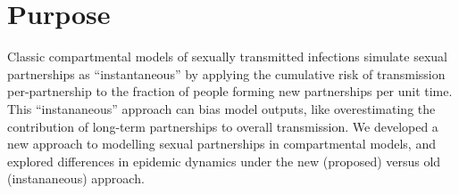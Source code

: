 \section{Purpose}
Classic compartmental models of sexually transmitted infections
simulate sexual partnerships as ``instantaneous'' by
applying the cumulative risk of transmission per-partnership
to the fraction of people forming new partnerships per unit time.
This ``instananeous'' approach can bias model outputs, like
overestimating the contribution of long-term partnerships to overall transmission.
We developed a new approach to modelling sexual partnerships in compartmental models,
and explored differences in epidemic dynamics
under the new (proposed) versus old (instananeous) approach.
